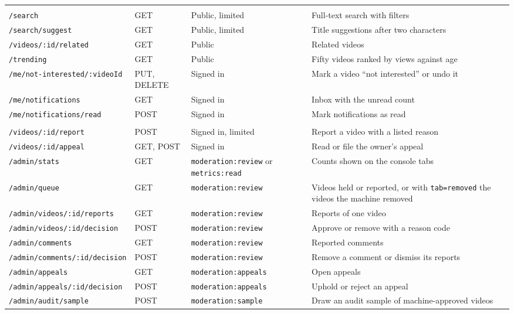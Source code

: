 \begin{footnotesize}
\begin{longtable}{>{\raggedright\arraybackslash}p{} >{\raggedright\arraybackslash}p{} >{\raggedright\arraybackslash}p{} >{\raggedright\arraybackslash}p{}}
\midrule
\multicolumn{4}{l}{\textit{Discovery and notifications}} \\
\texttt{/search} & GET & Public, limited & Full-text search with filters \\
\texttt{/search/suggest} & GET & Public, limited & Title suggestions after two characters \\
\texttt{/videos/:id/related} & GET & Public & Related videos \\
\texttt{/trending} & GET & Public & Fifty videos ranked by views against age \\
\texttt{/me/not-interested/:videoId} & PUT, DELETE & Signed in & Mark a video ``not interested'' or undo it \\
\texttt{/me/notifications} & GET & Signed in & Inbox with the unread count \\
\texttt{/me/notifications/read} & POST & Signed in & Mark notifications as read \\
\midrule
\multicolumn{4}{l}{\textit{Moderation and administration}} \\
\texttt{/videos/:id/report} & POST & Signed in, limited & Report a video with a listed reason \\
\texttt{/videos/:id/appeal} & GET, POST & Signed in & Read or file the owner's appeal \\
\texttt{/admin/stats} & GET & \texttt{moderation:review} or \texttt{metrics:read} & Counts shown on the console tabs \\
\texttt{/admin/queue} & GET & \texttt{moderation:review} & Videos held or reported, or with \texttt{tab=removed} the videos the machine removed \\
\texttt{/admin/videos/:id/reports} & GET & \texttt{moderation:review} & Reports of one video \\
\texttt{/admin/videos/:id/decision} & POST & \texttt{moderation:review} & Approve or remove with a reason code \\
\texttt{/admin/comments} & GET & \texttt{moderation:review} & Reported comments \\
\texttt{/admin/comments/:id/decision} & POST & \texttt{moderation:review} & Remove a comment or dismiss its reports \\
\texttt{/admin/appeals} & GET & \texttt{moderation:appeals} & Open appeals \\
\texttt{/admin/appeals/:id/decision} & POST & \texttt{moderation:appeals} & Uphold or reject an appeal \\
\texttt{/admin/audit/sample} & POST & \texttt{moderation:sample} & Draw an audit sample of machine-approved videos \\

\end{longtable}
\end{footnotesize}
